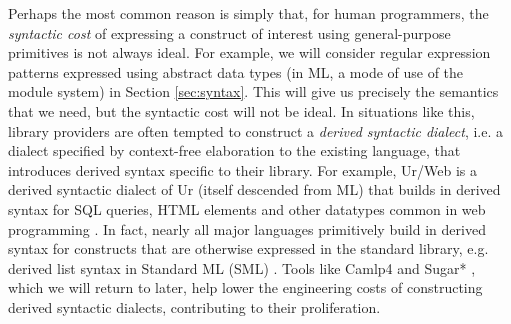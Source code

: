 
Perhaps the most common  reason is simply that, for human {programmers}, the \emph{syntactic cost} of expressing a construct of interest using general-purpose primitives is not always ideal. %
For example,  we will consider regular expression patterns expressed using abstract data types (in ML, a mode of use of the module system) in Section \ref{sec:syntax}. This will give  us precisely the semantics that we need, but the syntactic cost will not be ideal. In situations like this, library providers are often tempted to construct a \emph{derived syntactic dialect}, i.e. a dialect specified by context-free elaboration to the existing language, that introduces derived syntax specific to their library. For example, Ur/Web is a derived syntactic dialect of Ur (itself descended from ML) that builds in derived syntax for SQL queries, HTML elements and other datatypes common in web programming \cite{conf/popl/Chlipala15}. In fact, nearly all major languages primitively build in derived syntax for constructs that are otherwise expressed in the standard library, e.g. derived list syntax in Standard ML (SML) \cite{harper1997programming,mthm97-for-dart}. Tools like Camlp4 \cite{ocaml-manual} and Sugar* \cite{erdweg2011sugarj,erdweg2013framework}, which we will return to later, help lower the engineering costs of constructing derived syntactic dialects, contributing to their proliferation.%


